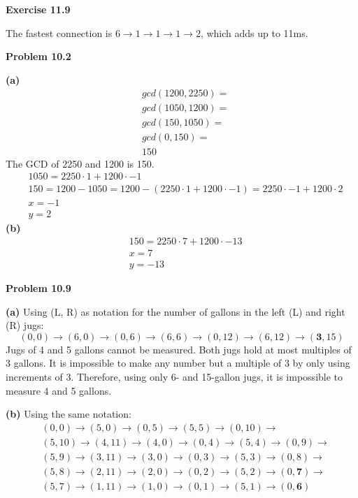 \documentclass[fleqn]{article}
\begin{document}
\newpage
{\Large\bf Exercise 11.9}\vspace{1em}\par
The fastest connection is $6 \rightarrow 1 \rightarrow 1 \rightarrow 1 \rightarrow 2$, which adds up to 11ms.

\newpage
{\Large\bf Problem 10.2}\vspace{1em}\par
\textbf{(a)}
\begin{align*}
	&gcd(1200,2250)=\\
	&gcd(1050,1200)=\\
	&gcd(150,1050)=\\
	&gcd(0,150)=\\
	&150
\end{align*}
The GCD of 2250 and 1200 is 150.
\begin{align*}
	&1050 = 2250 \cdot 1 + 1200 \cdot -1\\
	&150 = 1200 - 1050 = 1200 - (2250 \cdot 1 + 1200 \cdot -1) = 2250 \cdot -1 + 1200 \cdot 2\\
	&x = -1\\
	&y = 2
\end{align*}\vspace{1em}
\textbf{(b)}
\begin{align*}
	&150 = 2250 \cdot 7 + 1200 \cdot -13\\
	&x = 7\\
	&y = -13
\end{align*}

\newpage
{\Large\bf Problem 10.9}\vspace{1em}\par
\textbf{(a)} Using (L, R) as notation for the number of gallons in the left (L) and right (R) jugs:
\begin{equation*}
	(0,0) \rightarrow (6,0) \rightarrow (0,6) \rightarrow (6,6) \rightarrow (0,12) \rightarrow (6,12) \rightarrow (\mathbf{3},15)
\end{equation*}
Jugs of 4 and 5 gallons cannot be measured. Both jugs hold at most multiples of 3 gallons. It is impossible to make any number but a multiple of 3 by only using increments of 3. Therefore, using only 6- and 15-gallon jugs, it is impossible to measure 4 and 5 gallons.\vspace{1em}\par
\textbf{(b)} Using the same notation:
\begin{align*}
	&(0,0) \rightarrow (5,0) \rightarrow (0,5) \rightarrow (5,5) \rightarrow (0,10) \rightarrow\\
	&(5,10) \rightarrow (4,11) \rightarrow (4,0) \rightarrow (0,4) \rightarrow (5,4) \rightarrow (0,9) \rightarrow\\
	&(5,9) \rightarrow (3,11) \rightarrow (3,0) \rightarrow (0,3) \rightarrow (5,3) \rightarrow (0,8)\rightarrow\\
	&(5,8) \rightarrow (2,11) \rightarrow (2,0) \rightarrow (0,2) \rightarrow (5,2) \rightarrow (0,\mathbf{7}) \rightarrow\\
	&(5,7) \rightarrow (1,11) \rightarrow (1,0) \rightarrow (0,1) \rightarrow (5,1) \rightarrow (0,\mathbf{6})
\end{align*}
\end{document}
